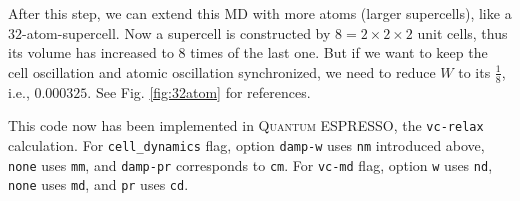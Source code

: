 After this step, we can extend this MD with more atoms (larger supercells), like a $32$-atom-supercell.
Now a supercell is constructed by $8 = 2 \times 2 \times 2$ unit cells, thus its volume has
increased to $8$ times of the last one. But if we want to keep the cell oscillation and atomic
oscillation synchronized, we need to reduce $W$ to its $\frac{ 1 }{ 8 }$, i.e., $0.000325$. See
Fig. \ref{fig:32atom} for references.

This code now has been implemented in \textsc{Quantum ESPRESSO}, the \texttt{vc-relax}
calculation. For \texttt{cell\_dynamics} flag, option \texttt{damp-w} uses \texttt{nm} introduced above, \texttt{none} uses \texttt{mm}, and \texttt{damp-pr} corresponds to \texttt{cm}.
For \texttt{vc-md} flag, option \texttt{w} uses \texttt{nd}, \texttt{none} uses \texttt{md}, and \texttt{pr} uses \texttt{cd}.
